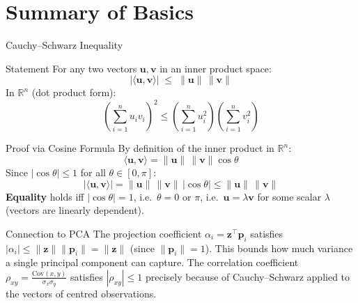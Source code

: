 \documentclass{beamer}
\begin{document}
\section{Summary of Basics}

\begin{frame}[shrink=10]{Cauchy--Schwarz Inequality}
  \begin{block}{Statement}
    For any two vectors $\mathbf{u}, \mathbf{v}$ in an inner product
    space:
    \[
      \lvert\langle\mathbf{u},\mathbf{v}\rangle\rvert
        \;\leq\; \|\mathbf{u}\|\,\|\mathbf{v}\|
    \]
    In $\mathbb{R}^n$ (dot product form):
    \[
      \left(\sum_{i=1}^n u_i v_i\right)^2
        \leq
        \left(\sum_{i=1}^n u_i^2\right)
        \left(\sum_{i=1}^n v_i^2\right)
    \]
  \end{block}

  \begin{block}{Proof via Cosine Formula}
    By definition of the inner product in $\mathbb{R}^n$:
    \[
      \langle\mathbf{u},\mathbf{v}\rangle
        = \|\mathbf{u}\|\,\|\mathbf{v}\|\cos\theta
    \]
    Since $|\cos\theta| \leq 1$ for all $\theta \in [0,\pi]$:
    \[
      |\langle\mathbf{u},\mathbf{v}\rangle|
        = \|\mathbf{u}\|\,\|\mathbf{v}\|\,|\cos\theta|
        \leq \|\mathbf{u}\|\,\|\mathbf{v}\|
    \]
    \textbf{Equality} holds iff $|\cos\theta| = 1$, i.e.\
    $\theta = 0$ or $\pi$, i.e.\
    $\mathbf{u} = \lambda\mathbf{v}$ for some scalar $\lambda$
    (vectors are linearly dependent).
  \end{block}

  \begin{exampleblock}{Connection to PCA}
    The projection coefficient $\alpha_i = \mathbf{z}^\top\mathbf{p}_i$
    satisfies $|\alpha_i| \leq \|\mathbf{z}\|\|\mathbf{p}_i\| = \|\mathbf{z}\|$
    (since $\|\mathbf{p}_i\|=1$). This bounds how much variance a single
    principal component can capture.
    The correlation coefficient $\rho_{xy} = \frac{\mathrm{Cov}(x,y)}{\sigma_x\sigma_y}$
    satisfies $|\rho_{xy}| \leq 1$ precisely because of Cauchy--Schwarz applied
    to the vectors of centred observations.
  \end{exampleblock}
\end{frame}
\end{document}

